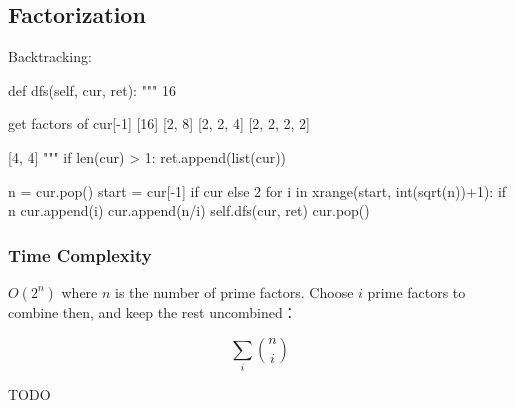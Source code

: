 \subsection{Factorization}
Backtracking: 
\begin{python}
def dfs(self, cur, ret):
    """
    16

    get factors of cur[-1]
    [16]
    [2, 8]
    [2, 2, 4]
    [2, 2, 2, 2]

    [4, 4]
    """
    if len(cur) > 1:
        ret.append(list(cur))

    n = cur.pop()
    start = cur[-1] if cur else 2
    for i in xrange(start, int(sqrt(n))+1):
        if n%
            cur.append(i)
            cur.append(n/i)
            self.dfs(cur, ret)
            cur.pop()
\end{python}
\subsubsection{Time Complexity}
$O(2^n)$ where $n$ is the number of prime factors. Choose $i$ prime factors to combine then, and keep the rest uncombined： 

$$\sum_i {n \choose i}$$

TODO



